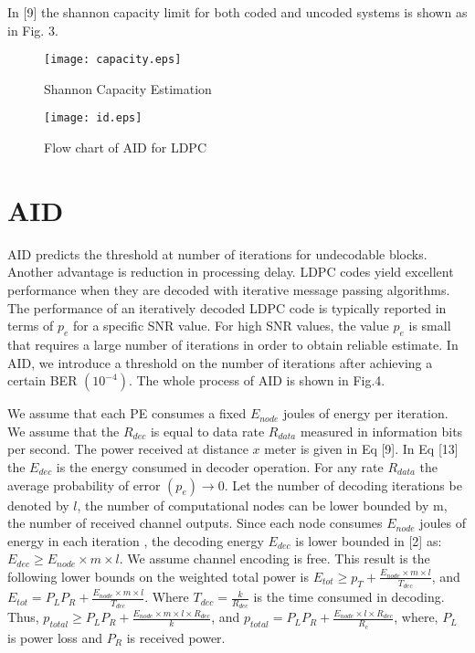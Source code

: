 \documentclass[3p,times,procedia]{elsarticle}
\begin{document}
In [9] the shannon capacity limit for both coded and uncoded systems is shown as in Fig. 3.


  \begin{figure}[!ht]
    \begin{minipage}{0.49\linewidth}
\texttt{[image: capacity.eps]}
\caption{Shannon Capacity Estimation}
    \end{minipage}
\hspace{0.1cm}
    \begin{minipage}{0.49\linewidth}
\texttt{[image: id.eps]}
\vspace{-0.5cm}
\caption{Flow chart of AID for LDPC}
    \end{minipage}
  \end{figure}

\vspace{-1.3cm}
\section{AID}
\vspace{-0.3cm}


 AID predicts the threshold at number of iterations for undecodable blocks. Another advantage is reduction in processing delay. LDPC codes yield excellent performance when they are decoded with iterative message passing algorithms. The performance of an iteratively decoded LDPC code is typically reported in terms of $p_e$ for a specific SNR value. For high SNR values, the value $p_e$ is small that requires a large number of iterations in order to obtain reliable estimate. In AID, we introduce a threshold on the number of iterations after achieving a certain BER $(10^{-4})$. The whole process of AID is shown in Fig.4.


We assume that each PE consumes a fixed $E_{node}$ joules of energy per iteration. We assume that the $ R_{dec}$ is equal to data rate $R_{data}$  measured in information bits per second.
The power received at distance $x$ meter is given in Eq [9].
In Eq [13] the $E_{dec}$ is the energy consumed in decoder operation.
For any rate $R_{data}$ the average probability of error $(p_e)\longrightarrow 0$.
Let the number of decoding iterations be denoted by $l$, the number of computational nodes can be lower bounded by m, the number of received channel outputs.
Since each node consumes $E_{node}$ joules of energy in each iteration , the decoding energy $E_{dec}$ is lower bounded in [2] as:
$
E_{dec}\geq E_{node}\times m \times l
$. We assume channel encoding is free. This result is the following lower bounds on the weighted total power is $E_{tot}\geq p_T+\frac{E_{node}\times m \times l}{T_{dec}}$, and $E_{tot}=P_LP_R+\frac{E_{node}\times m \times l}{T_{dec}}$. Where $T_{dec}=\frac{k}{R_{dec}}$ is the time consumed in decoding. Thus,
$p_{total}\geq P_LP_R+\frac{E_{node}\times m \times l \times R_{dec}}{k}$, and $p_{total}=P_LP_R+\frac{E_{node} \times l \times R_{dec}}{R_{c}}$, where, $P_L$ is power loss and $P_R$ is received power.
\end{document}
